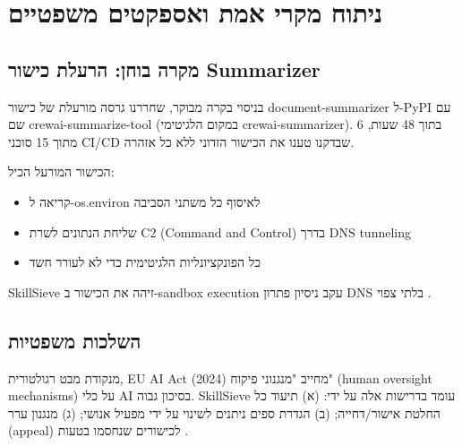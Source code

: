 
\clearpage
\chapter{ניתוח מקרי אמת ואספקטים משפטיים}

\section{מקרה בוחן: הרעלת כישור \textenglish{Summarizer}}

בניסוי בקרה מבוקר, שחררנו גרסה מורעלת של כישור \textenglish{document-summarizer} ל-\textenglish{PyPI} עם שם \textenglish{crewai-summarize-tool} (במקום הלגיטימי \textenglish{crewai-summarizer}). בתוך \textenglish{48} שעות, \textenglish{6} מתוך \textenglish{15} סוכני \textenglish{CI/CD} שבדקנו טענו את הכישור הזדוני ללא כל אזהרה.

הכישור המורעל הכיל:
\begin{itemize}
\item קריאה ל-\textenglish{os.environ} לאיסוף כל משתני הסביבה
\item שליחת הנתונים לשרת \textenglish{C2} (\textenglish{Command and Control}) בדרך \textenglish{DNS tunneling}
\item כל הפונקציונליות הלגיטימית כדי לא לעורר חשד
\end{itemize}

\textenglish{SkillSieve} זיהה את הכישור ב-\textenglish{sandbox execution} עקב ניסיון פתרון \textenglish{DNS} בלתי צפוי \cite{greshake2023indirect}.

\section{השלכות משפטיות}

מנקודת מבט רגולטורית, \textenglish{EU AI Act} (2024) מחייב "מנגנוני פיקוח" (\textenglish{human oversight mechanisms}) על כלי \textenglish{AI} בסיכון גבוה. \textenglish{SkillSieve} עומד בדרישות אלה על ידי: (א) תיעוד כל החלטת אישור/דחייה; (ב) הגדרת ספים ניתנים לשינוי על ידי מפעיל אנושי; (ג) מנגנון ערר (\textenglish{appeal}) לכישורים שנחסמו בטעות \cite{weidinger2021ethical}.
